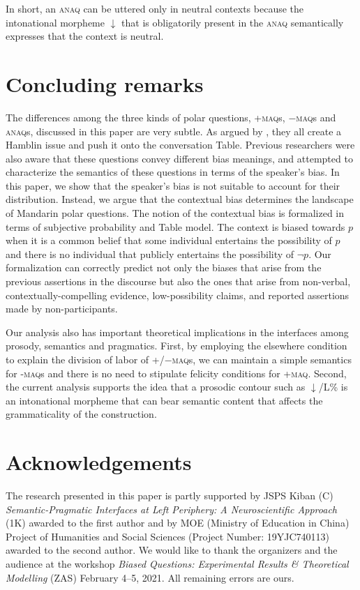 \documentclass[output=paper,colorlinks,citecolor=brown]{langscibook}
\begin{document}
In short, an \textsc{anaq} can be uttered only in neutral contexts because the intonational morpheme $\downarrow$ that is obligatorily present in the \textsc{anaq} semantically expresses that the context is neutral.
	
\section{Concluding remarks}
The differences among the three kinds of polar questions, +\textsc{maq}s, $-$\textsc{maq}s and \textsc{anaq}s, discussed in this paper are very subtle.  As argued by \citet{YuanHaraGlowinAsia2019}, they all create a Hamblin issue and push it onto the conversation Table.  Previous researchers were also aware that these questions convey different bias meanings, and attempted to characterize the semantics of these questions in terms of the speaker's bias. In this paper, we show that the speaker's bias is not suitable to account for their distribution. Instead, we argue that the contextual bias determines the landscape of Mandarin polar questions.  The notion of the contextual bias is formalized in terms of subjective probability and  Table model. The context is biased towards $p$ when it is a common belief that some individual entertains the possibility of $p$ and there is no individual that publicly entertains the possibility of $\neg p$.  Our formalization can correctly predict not only the  biases that arise from the previous assertions in the discourse but also the ones  that arise from non-verbal, contextually-compelling evidence, low-possibility claims, and reported assertions made by non-participants.

Our analysis also has important theoretical implications in the interfaces a\-mong prosody, semantics and pragmatics.  First, by employing the elsewhere condition to explain the division of labor of +/$-$\textsc{maq}s, we can maintain a simple semantics for -\textsc{maq}s and there is no need to stipulate felicity conditions for +\textsc{maq}.  Second, the current analysis supports the idea that a prosodic contour such as $\downarrow$/L\% is an intonational morpheme that can bear semantic content that affects the grammaticality of the construction.


\section*{Acknowledgements}
The research presented in this paper is partly supported by JSPS Kiban (C) \textit{Se\-man\-tic-Pragmatic Interfaces at Left Periphery: A Neuroscientific Approach} (1\-K) awarded to the first author and by MOE (Ministry of Education in China) Project of Humanities and Social Sciences (Project Number: 19YJC740113) a\-ward\-ed to the second author.  We would like to thank the organizers and the audience at the workshop \textit{Biased Questions: Experimental Results \& Theoretical Modelling}  (ZAS) February 4–5, 2021.  All remaining errors are ours.

\printbibliography[heading=subbibliography,notkeyword=this]
\end{document}
